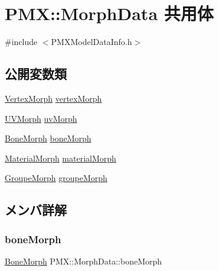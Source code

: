 \hypertarget{union_p_m_x_1_1_morph_data}{}\section{P\+MX\+:\+:Morph\+Data 共用体}
\label{union_p_m_x_1_1_morph_data}


{\ttfamily \#include $<$P\+M\+X\+Model\+Data\+Info.\+h$>$}

\subsection*{公開変数類}
\begin{DoxyCompactItemize}
\item 
\mbox{\hyperlink{struct_p_m_x_1_1_vertex_morph}{Vertex\+Morph}} \mbox{\hyperlink{union_p_m_x_1_1_morph_data_a3bce7c273ed03c8e97418905770de4e8}{vertex\+Morph}}
\item 
\mbox{\hyperlink{struct_p_m_x_1_1_u_v_morph}{U\+V\+Morph}} \mbox{\hyperlink{union_p_m_x_1_1_morph_data_a8e0357f832d5ed6925c7d74f7286d91a}{uv\+Morph}}
\item 
\mbox{\hyperlink{struct_p_m_x_1_1_bone_morph}{Bone\+Morph}} \mbox{\hyperlink{union_p_m_x_1_1_morph_data_a107c98662db8e6bd241ff99610ee2525}{bone\+Morph}}
\item 
\mbox{\hyperlink{struct_p_m_x_1_1_material_morph}{Material\+Morph}} \mbox{\hyperlink{union_p_m_x_1_1_morph_data_a3bf11d81e50eea731da58a4693f0d38d}{material\+Morph}}
\item 
\mbox{\hyperlink{struct_p_m_x_1_1_groupe_morph}{Groupe\+Morph}} \mbox{\hyperlink{union_p_m_x_1_1_morph_data_ace5e8cc3e8bf60bb3a5352f676a15088}{groupe\+Morph}}
\end{DoxyCompactItemize}


\subsection{メンバ詳解}
\mbox{\label{union_p_m_x_1_1_morph_data_a107c98662db8e6bd241ff99610ee2525}} 
\subsubsection{\texorpdfstring{bone\+Morph}{boneMorph}}
{\footnotesize\ttfamily \mbox{\hyperlink{struct_p_m_x_1_1_bone_morph}{Bone\+Morph}} P\+M\+X\+::\+Morph\+Data\+::bone\+Morph}

